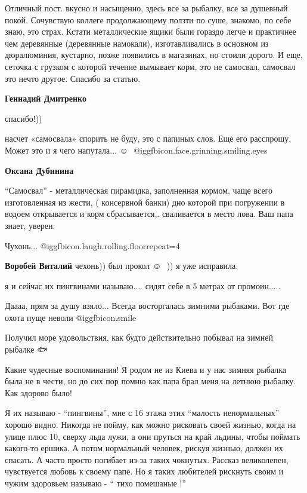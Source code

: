 \begin{itemize}

Отличный пост. вкусно и насыщенно, здесь все за рыбалку, все за душевный покой.
Сочувствую коллеге продолжающему ползти по суше, знакомо, по себе знаю, это
страх. Кстати металлические ящики были гораздо легче и практичнее чем
деревянные (деревянные намокали), изготавливались в основном из дюралюминия,
кустарно, позже появились в магазинах, но стоили дорого. И еще, сеточка с
грузком с которой течение вымывает корм, это не самосвал, самосвал это нечто
другое. Спасибо за статью.

\begin{itemize} %
\textbf{Геннадий Дмитренко} 

спасибо!))

насчет «самосвала» спорить не буду, это с папиных слов. Еще его расспрошу.
Может это и я чего напутала... ☺ ️  @igg{fbicon.face.grinning.smiling.eyes} 

\textbf{Оксана Дубинина} 

\enquote{Самосвал} - металлическая пирамидка, заполненная кормом, чаще всего
изготовленная из жести, ( консервной банки) дно которой при погружении в водоем
открывается и корм сбрасывается,. сваливается в место лова. Ваш папа знает,
уверен.

\end{itemize} %

Чухонь... @igg{fbicon.laugh.rolling.floor}{repeat=4} 

\textbf{Воробей Виталий} чехонь)) был прокол ☺ ️ )) я уже исправила.

я и сейчас их пингвинами называю.... сидят себе в 5 метрах от промоин.....

Даааа, прям за душу взяло... Всегда восторгалась зимними рыбаками. Вот где охота пуще неволи  @igg{fbicon.smile} 

Получил море удовольствия, как будто действительно побывал на зимней рыбалке 🐟


Какие чудесные воспоминания! Я родом не из Киева и у нас зимняя рыбалка была не
в чести, но до сих пор помню как папа брал меня на летнюю рыбалку. Как здорово
было!


Я их называю - \enquote{пингвины}, мне с 16 этажа этих \enquote{малость ненормальных} хорошо
видно. Никогда не пойму, как можно рисковать своей жизнью, когда на улице плюс
10, сверху льда лужи, а они пруться на край льдины, чтобы поймать какого-то
ершика. А потом нормальный человек, рискуя жизнью, должен их спасать. А часто
просто погибает из-за таких чокнутых. Рассказ великолепен, чувствуется любовь к
своему папе. Но я таких любителей рискнуть своим и чужим здоровьем называю - \enquote{
тихо помешаные !}


\end{itemize}
